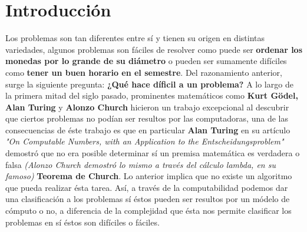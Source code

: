 \documentclass{article}
\begin{document}

\section{Introducción}
\noindent
Los problemas son tan diferentes entre sí y tienen su origen en distintas variedades, algunos 
problemas son fáciles de resolver como puede ser \textbf{ordenar los monedas por lo grande de su diámetro}
o pueden ser sumamente difíciles como \textbf{tener un buen horario en el semestre}. Del razonamiento anterior,
surge la siguiente pregunta: \textbf{¿Qué hace díficil a un problema?}
\newline 
A lo largo de la primera mitad del siglo pasado, prominentes matemáticos como \textbf{Kurt Gödel, Alan Turing}
y \textbf{Alonzo Church} hicieron un trabajo excepcional al descubrir que ciertos problemas no podían ser 
resultos por las computadoras, una de las consecuencias de éste trabajo es que en particular 
\textbf{Alan Turing} en su artículo \textit{ "On Computable Numbers, with an Application to the Entscheidungsproblem"}
demostró que no era posible determinar sí un premisa matemática es verdadera o falsa \textit{(Alonzo Church demostró 
lo mismo a través del cálculo lambda, en su famoso)} \textbf{Teorema de Church}. Lo anterior implica que no existe 
un algoritmo que pueda realizar ésta tarea. 
\newline 
Así, a través de la computabilidad podemos dar una clasificación a los problemas sí éstos pueden ser resultos por un
módelo de cómputo o no, a diferencia de la complejidad que ésta nos permite clasificar los problemas en sí éstos son 
difíciles o fáciles. 
\end{document}
